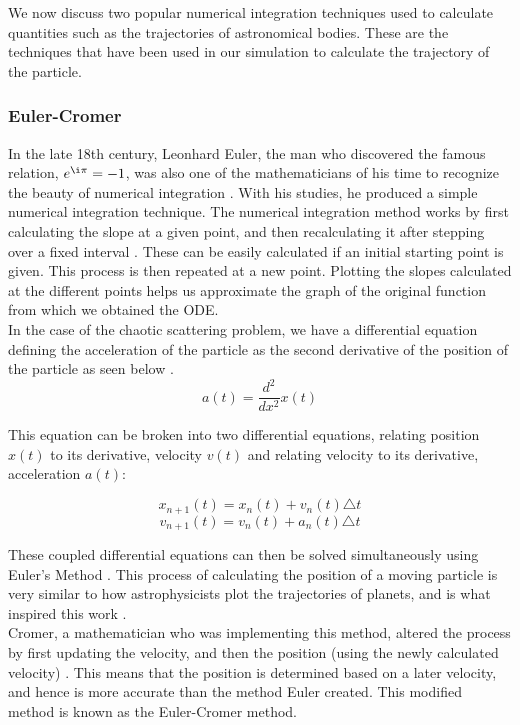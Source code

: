 \documentclass[12pt]{article} %
\begin{document}
We now discuss two popular numerical integration techniques used to calculate quantities such as the trajectories of astronomical bodies. These are the techniques that have been used in our simulation to calculate the trajectory of the particle.


\subsubsection{Euler-Cromer} \label{NumericalInt:EulerCromer}



In the late 18th century, Leonhard Euler, the man who discovered the famous relation, $e^{ \i \pi} = -1$, was also one of the mathematicians of his time to recognize the beauty of numerical integration \cite{comparingODE}. With his studies, he produced a simple numerical integration technique. The numerical integration method works by first calculating the slope at a given point, and then recalculating it after stepping over a fixed interval \cite{ODE}. These can be easily calculated if an initial starting point is given. This process is then repeated at a new point. Plotting the slopes calculated at the different points helps us approximate the graph of the original function from which we obtained the ODE. \\

In the case of the chaotic scattering problem, we have a differential equation defining the acceleration of the particle as the second derivative of the position of the particle as seen below \cite{computationalText}. 
$$ a (t) = \frac{d^2}{dx^2} x(t)  $$

 This equation can be broken into two differential equations, relating position $x(t)$ to its derivative, velocity $v(t)$ and relating velocity to its derivative, acceleration $a(t)$:


$$ x_{n+1}(t) = x_{n}(t) + v_{n}(t) \triangle t$$
$$ v_{n+1}(t) = v_{n}(t) + a_{n}(t) \triangle t$$


These coupled differential equations can then be solved simultaneously using Euler's Method \cite{computationalText}. This process of calculating the position of a moving particle is very similar to how astrophysicists plot the trajectories of planets, and is what inspired this work \cite{computationalText}.\\

Cromer, a mathematician who was implementing this method, altered the process by first updating the velocity, and then the position (using the newly calculated velocity) \cite{comparingODE}. This means that the position is determined based on a later velocity, and hence is more accurate than the method Euler created. This modified method is known as the Euler-Cromer method. \\
\end{document}
